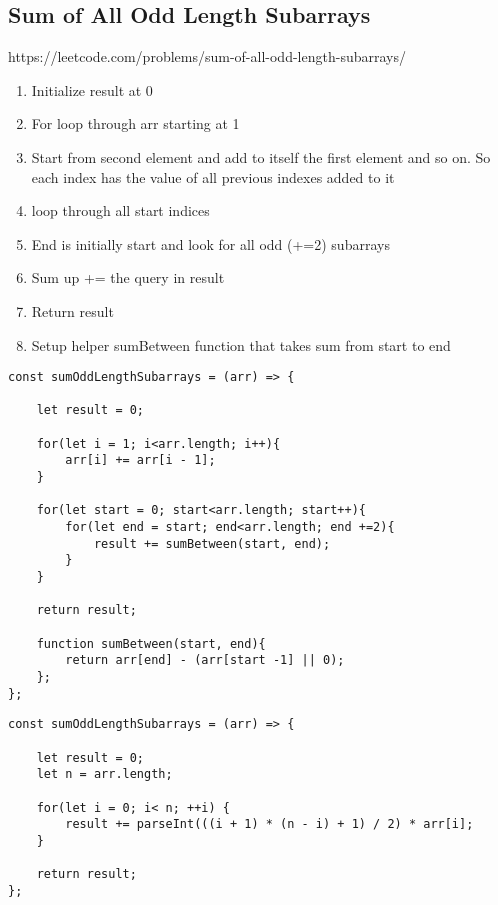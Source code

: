 \documentclass[10pt]{article}
\begin{document}
\medskip %

\pagebreak
\medskip %
\subsection{Sum of All Odd Length Subarrays}
https://leetcode.com/problems/sum-of-all-odd-length-subarrays/

\begin{enumerate}
	\item Initialize result at 0 
	\item For loop through arr starting at 1
	\item Start from second element and add to itself the first element and so on. So each index has the value of all previous indexes added to it
	\item loop through all start indices 
	\item End is initially start and look for all odd (+=2) subarrays
	\item Sum up += the query in result 
	\item Return result 
	\item Setup helper sumBetween function that takes sum from start to end 
\end{enumerate}

\begin{lstlisting}[title=Solution sumOddLengthSubarrays with helper function, captionpos=t]
const sumOddLengthSubarrays = (arr) => {

    let result = 0;
 
    for(let i = 1; i<arr.length; i++){
        arr[i] += arr[i - 1];
    }

    for(let start = 0; start<arr.length; start++){
        for(let end = start; end<arr.length; end +=2){
            result += sumBetween(start, end);
        }
    }
    
    return result;

    function sumBetween(start, end){
        return arr[end] - (arr[start -1] || 0);
    };
};
\end{lstlisting}

\begin{lstlisting}[title=Solution sumOddLengthSubarrays with parseInt, captionpos=t]
const sumOddLengthSubarrays = (arr) => {

    let result = 0;
    let n = arr.length;

    for(let i = 0; i< n; ++i) {
        result += parseInt(((i + 1) * (n - i) + 1) / 2) * arr[i];
    }
    
    return result;
};
\end{lstlisting}
\end{document}
